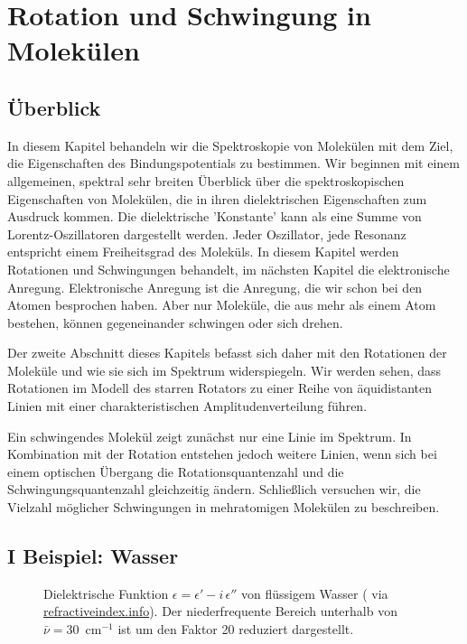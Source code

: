 \renewcommand{\lastmod}{20. Dezember 2024}
\renewcommand{\chapterauthors}{Markus Lippitz}

\chapter{Rotation und Schwingung in Molekülen}



\section{Überblick}


In diesem Kapitel behandeln wir die Spektroskopie von Molekülen mit dem Ziel, die Eigenschaften des Bindungspotentials zu bestimmen. Wir beginnen mit einem allgemeinen, spektral sehr breiten Überblick über die spektroskopischen Eigenschaften von Molekülen, die in ihren dielektrischen Eigenschaften zum Ausdruck kommen. Die dielektrische 'Konstante' kann als eine Summe von Lorentz-Oszillatoren dargestellt werden.  Jeder Oszillator, jede Resonanz entspricht einem Freiheitsgrad des Moleküls. In diesem Kapitel werden Rotationen und Schwingungen behandelt, im nächsten Kapitel die elektronische Anregung. Elektronische Anregung ist die Anregung, die wir schon bei den Atomen besprochen haben. Aber nur Moleküle, die aus mehr als einem Atom bestehen, können gegeneinander schwingen oder sich drehen.

Der zweite Abschnitt dieses Kapitels befasst sich daher mit den Rotationen der Moleküle und wie sie sich im Spektrum widerspiegeln. Wir werden sehen, dass Rotationen im Modell des starren Rotators zu einer Reihe von äquidistanten Linien mit einer charakteristischen Amplitudenverteilung führen.

Ein schwingendes Molekül zeigt zunächst nur eine Linie im Spektrum. In Kombination mit der Rotation entstehen jedoch weitere Linien, wenn sich bei einem optischen Übergang die Rotationsquantenzahl und die Schwingungsquantenzahl gleichzeitig ändern. Schließlich versuchen wir, die Vielzahl möglicher Schwingungen in mehratomigen Molekülen zu beschreiben.


\section{I Beispiel: Wasser}

\begin{figure}
\caption{Dielektrische Funktion $\epsilon = \epsilon' - i \, \epsilon''$ von flüssigem Wasser (\cite{Segelstein_water} via 
\href{https://refractiveindex.info/?shelf=main&book=H2O&page=Segelstein}{refractiveindex.info}). Der niederfrequente Bereich unterhalb von $\bar{\nu} = 30$~cm$^{-1}$ ist um den Faktor 20 reduziert dargestellt.
\label{fig:diel_water}}

\end{figure}


